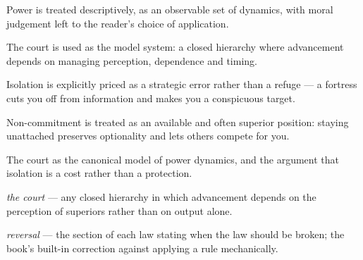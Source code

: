 

\begin{distilled}
  \item Power is treated descriptively, as an observable set of dynamics, with moral judgement left to the reader's choice of application.
  \item The court is used as the model system: a closed hierarchy where advancement depends on managing perception, dependence and timing.
  \item Isolation is explicitly priced as a strategic error rather than a refuge --- a fortress cuts you off from information and makes you a conspicuous target.
  \item Non-commitment is treated as an available and often superior position: staying unattached preserves optionality and lets others compete for you.
\end{distilled}

\begin{unique}
  \item The court as the canonical model of power dynamics, and the argument that isolation is a cost rather than a protection.
\end{unique}

\begin{terms}
  \item \emph{the court} --- any closed hierarchy in which advancement depends on the perception of superiors rather than on output alone.
  \item \emph{reversal} --- the section of each law stating when the law should be broken; the book's built-in correction against applying a rule mechanically.
\end{terms}

